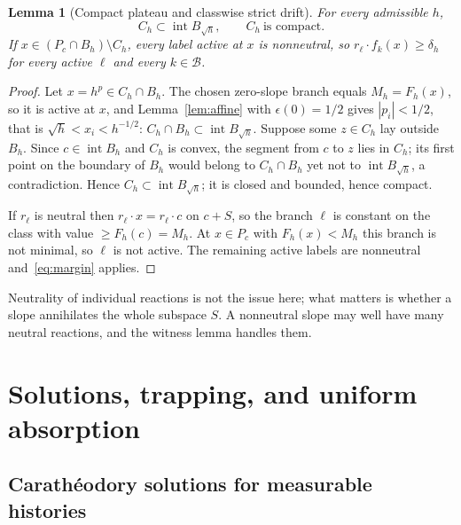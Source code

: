 \documentclass[11pt]{article}
\newtheorem{lemma}[theorem]{Lemma}
\theoremstyle{definition}
\theoremstyle{remark}
\newcommand{\B}{\mathcal B}
\DeclareMathOperator{\interior}{int}
\begin{document}
\begin{lemma}[Compact plateau and classwise strict drift]\label{lem:plateau}
For every admissible $h$,
\[
 C_h\subset\interior B_{\sqrt h},\qquad C_h\ \text{is compact}.
\]
If $x\in(P_c\cap B_h)\setminus C_h$, every label active at $x$ is nonneutral, so
$r_\ell\cdot f_k(x)\ge\delta_h$ for every active $\ell$ and every $k\in\B$.
\end{lemma}
\begin{proof}
Let $x=h^{p}\in C_h\cap B_h$. The chosen zero-slope branch equals $M_h=F_h(x)$, so it
is active at $x$, and Lemma~\ref{lem:affine} with $\epsilon(0)=1/2$ gives
$|p_i|<1/2$, that is $\sqrt h<x_i<h^{-1/2}$: $C_h\cap B_h\subset\interior B_{\sqrt h}$.
Suppose some $z\in C_h$ lay outside $B_h$. Since $c\in\interior B_h$ and $C_h$ is
convex, the segment from $c$ to $z$ lies in $C_h$; its first point on the boundary
of $B_h$ would belong to $C_h\cap B_h$ yet not to $\interior B_{\sqrt h}$, a
contradiction. Hence $C_h\subset\interior B_{\sqrt h}$; it is closed and bounded,
hence compact.

If $r_\ell$ is neutral then $r_\ell\cdot x=r_\ell\cdot c$ on $c+S$, so the branch
$\ell$ is constant on the class with value $\ge F_h(c)=M_h$. At $x\in P_c$ with
$F_h(x)<M_h$ this branch is not minimal, so $\ell$ is not active. The remaining
active labels are nonneutral and~\eqref{eq:margin} applies.
\end{proof}

Neutrality of individual reactions is not the issue here; what matters is whether
a slope annihilates the whole subspace $S$. A nonneutral slope may well have many
neutral reactions, and the witness lemma handles them.

\section{Solutions, trapping, and uniform absorption}\label{sec:solutions}

\subsection{Carath\'eodory solutions for measurable histories}\label{sec:bridge}
\end{document}
